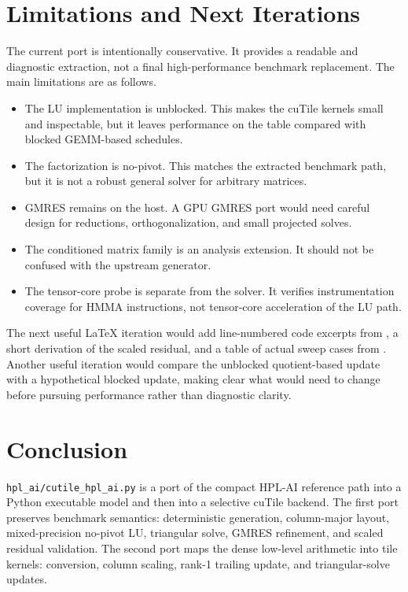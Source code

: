 \documentclass[11pt]{article}
\newcommand{\filecutile}{\texttt{hpl\_ai/cutile\_hpl\_ai.py}}
\newcommand{\hplai}{HPL-AI}
\newcommand{\cutile}{cuTile}
\begin{document}
\section{Limitations and Next Iterations}

The current port is intentionally conservative. It provides a readable and
diagnostic extraction, not a final high-performance benchmark replacement.
The main limitations are as follows.

\begin{itemize}
  \item The LU implementation is unblocked. This makes the \cutile{} kernels
  small and inspectable, but it leaves performance on the table compared with
  blocked GEMM-based schedules.
  \item The factorization is no-pivot. This matches the extracted benchmark
  path, but it is not a robust general solver for arbitrary matrices.
  \item GMRES remains on the host. A GPU GMRES port would need careful design
  for reductions, orthogonalization, and small projected solves.
  \item The conditioned matrix family is an analysis extension. It should not
  be confused with the upstream generator.
  \item The tensor-core probe is separate from the solver. It verifies
  instrumentation coverage for HMMA instructions, not tensor-core acceleration
  of the LU path.
\end{itemize}

The next useful LaTeX iteration would add line-numbered code excerpts from
, a short derivation of the scaled residual, and
a table of actual sweep cases from .
Another useful iteration would compare the unblocked quotient-based update
with a hypothetical blocked update, making clear what would need to change
before pursuing performance rather than diagnostic clarity.

\section{Conclusion}

\filecutile{} is a port of the compact \hplai{} reference path into a Python
executable model and then into a selective \cutile{} backend. The first port
preserves benchmark semantics: deterministic generation, column-major layout,
mixed-precision no-pivot LU, triangular solve, GMRES refinement, and scaled
residual validation. The second port maps the dense low-level arithmetic into
tile kernels: conversion, column scaling, rank-1 trailing update, and
triangular-solve updates.
\end{document}
